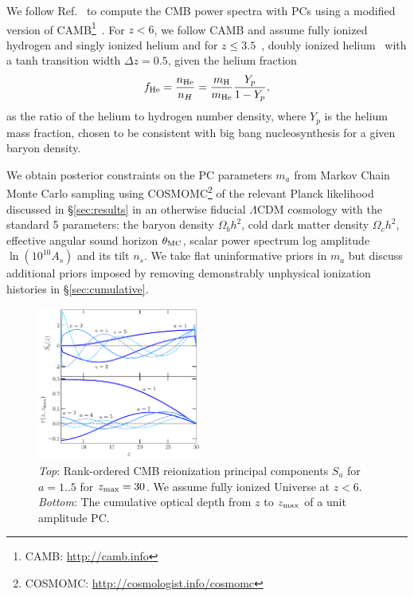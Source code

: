 \documentclass[prd,twocolumn,amsmath,amssymb,floatfix,superscriptaddress,nofootinbib]{revtex4-1}
\newcommand{\zmax}{z_{\rm max}}
\newcommand{\beq}{\begin{equation}}
\newcommand{\eeq}{\end{equation}}
\begin{document}
We follow Ref.~\cite{Heinrich:2018btc} to compute the CMB power spectra with PCs using a modified version of CAMB\footnote{CAMB: \url{http://camb.info}}~\cite{Lewis:1999bs, Howlett:2012mh}. 
For $z<6$, we follow CAMB and assume fully ionized hydrogen and singly ionized helium and for $z\leq 3.5$~\cite{Becker:2010cu}, doubly ionized helium~\cite{Becker:2010cu} with a tanh transition width $\Delta z = 0.5$, given the helium fraction
 \beq
 f_{\rm He} = \frac{n_{\rm He}}{n_{H}} = \frac{m_{\rm H}}{m_{\rm He}} \frac{Y_p}{1 - Y_p}, 
 \eeq
as the ratio of the helium to hydrogen number density, where $Y_p$ is the helium mass fraction, chosen to be consistent with big bang nucleosynthesis for a given baryon density. 






We obtain posterior constraints on the PC parameters $m_a$ from Markov Chain Monte Carlo sampling using COSMOMC\footnote{COSMOMC: \url{http://cosmologist.info/cosmomc}} of the relevant Planck likelihood discussed in \S \ref{sec:results} in an otherwise fiducial $\Lambda$CDM cosmology with the standard 5 parameters: the baryon density $\Omega_b h^2$, cold dark matter density 
$\Omega_c h^2$, effective angular sound horizon $\theta_{\rm MC}$, scalar power spectrum log amplitude $\ln (10^{10} A_s)$ and
its tilt $n_s$.  We take flat uninformative
priors in $m_a$ but discuss additional priors imposed by
removing demonstrably  unphysical ionization histories in \S \ref{sec:cumulative}.

 \begin{figure}
          \includegraphics[width=0.48\textwidth]{paper/plots/pl18_plot_pub_xe_basis_tau_basis_zmax30_heinrich.pdf}
          \caption{\textit{Top}: Rank-ordered CMB reionization principal components $S_a$ for $a = 1..5$ for $\zmax = 30$. We assume fully ionized Universe at $z < 6$. \textit{Bottom}: The cumulative optical depth from $z$ to $z_{\rm max}$ of a unit amplitude PC. } 
          \label{fig:xe}
\end{figure}
\end{document}
